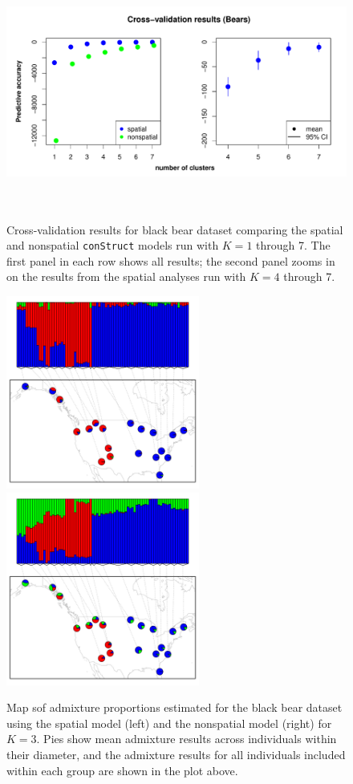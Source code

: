 \documentclass[12pt]{article}
\begin{document}
\begin{figure}
	\centering
		{\includegraphics[width=6in,height=3in]{figs/bears/bear_std_xval.pdf}}
	\caption{
	Cross-validation results for black bear dataset 
	comparing the spatial and nonspatial \texttt{conStruct} models run with $K=1$ through 7.  
	The first panel in each row shows all results; 
	the second panel zooms in on the results from the spatial analyses run with $K = 4$ through 7.
    }\label{bear_xvals}
\end{figure}

\begin{figure}
	\centering
			{\includegraphics[width=2.5in,height=2.5in]{figs/bears/bear_sp3.pdf}}
			{\includegraphics[width=2.5in,height=2.5in]{figs/bears/bear_nsp3.pdf}}
	\caption{
	Map sof admixture proportions estimated for the black bear dataset 
	using the spatial model (left) and the nonspatial model (right) for $K=3$.
	Pies show mean admixture results across individuals within their diameter, 
	and the admixture results for all individuals included within each group are 
	shown in the plot above.
    }\label{bear_K3}
\end{figure}
\end{document}
